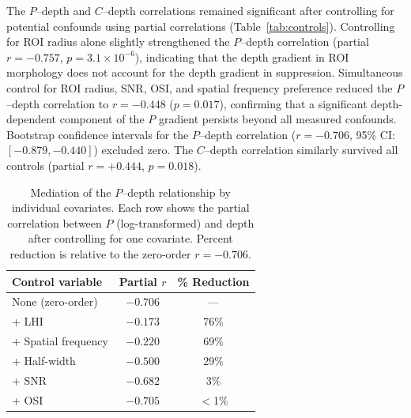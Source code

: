 \documentclass[11pt,letterpaper]{article}
\begin{document}
The $P$--depth and $C$--depth correlations remained significant after
controlling for potential confounds using partial correlations
(Table~\ref{tab:controls}). Controlling for ROI radius alone slightly
strengthened the $P$--depth correlation (partial $r = -0.757$,
$p = 3.1 \times 10^{-6}$), indicating that the depth gradient in ROI
morphology does not account for the depth gradient in suppression.
Simultaneous control for ROI radius, SNR, OSI, and spatial frequency
preference reduced the $P$--depth correlation to $r = -0.448$ ($p = 0.017$),
confirming that a significant depth-dependent component of the $P$ gradient
persists beyond all measured confounds. Bootstrap confidence intervals for
the $P$--depth correlation ($r = -0.706$, 95\% CI: $[-0.879, -0.440]$)
excluded zero. The $C$--depth correlation similarly survived all controls
(partial $r = +0.444$, $p = 0.018$).

\begin{table}[tbp]
  \centering
  \caption{Mediation of the $P$--depth relationship by individual covariates.
    Each row shows the partial correlation between $P$ (log-transformed) and
    depth after controlling for one covariate. Percent reduction is relative
    to the zero-order $r = -0.706$.}
  \label{tab:mediation}
  \begin{tabular}{lcc}
    \toprule
    Control variable & Partial $r$ & \% Reduction \\
    \midrule
    None (zero-order)         & $-0.706$ & ---  \\
    + LHI                     & $-0.173$ & 76\% \\
    + Spatial frequency       & $-0.220$ & 69\% \\
    + Half-width              & $-0.500$ & 29\% \\
    + SNR                     & $-0.682$ &  3\% \\
    + OSI                     & $-0.705$ & $<$1\% \\
    \bottomrule
  \end{tabular}
\end{table}
\end{document}
